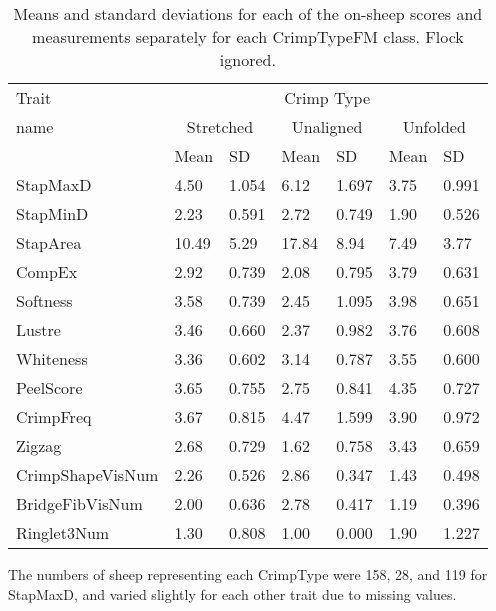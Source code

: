 %

\begin{table}[htp]
\centering
\caption{Means and standard deviations for each of the on-sheep scores and measurements separately for each CrimpTypeFM class. Flock ignored.}
\label{tab:means}
\vspace{0.1in}
\begin{tabular}{|p{1.2in}|p{0.5in}|p{0.5in}|p{0.5in}|p{0.5in}|p{0.5in}|p{0.5in}|}  \hline
  Trait  & \multicolumn{6}{c|}{Crimp Type}     \\ \cline{2-7}  
  name   & \multicolumn{2}{c|}{Stretched}   & \multicolumn{2}{c|}{Unaligned}  & \multicolumn{2}{c|}{Unfolded}  \\ \cline{2-7}
         & Mean & SD & Mean & SD & Mean & SD \\ \hline
 StapMaxD &  4.50  & 1.054 & 6.12  & 1.697 & 3.75 & 0.991 \\
 StapMinD &  2.23  & 0.591 & 2.72  & 0.749 & 1.90 & 0.526 \\
 StapArea &  10.49 & 5.29 & 17.84  & 8.94  & 7.49 & 3.77 \\
 CompEx   &  2.92  & 0.739 & 2.08  & 0.795 & 3.79 & 0.631 \\
 Softness &  3.58  & 0.739 & 2.45  & 1.095 & 3.98 & 0.651 \\
 Lustre   &  3.46  & 0.660 & 2.37  & 0.982 & 3.76 & 0.608 \\
 Whiteness & 3.36  & 0.602 & 3.14  & 0.787 & 3.55 & 0.600 \\
 PeelScore & 3.65  & 0.755 & 2.75  & 0.841 & 4.35 & 0.727 \\
 CrimpFreq & 3.67  & 0.815 & 4.47  & 1.599 & 3.90 & 0.972 \\
 Zigzag   &  2.68  & 0.729 & 1.62  & 0.758 & 3.43 & 0.659 \\ \hline
 CrimpShapeVisNum & 2.26 & 0.526 & 2.86 & 0.347 & 1.43 & 0.498 \\
 BridgeFibVisNum  & 2.00 & 0.636 & 2.78 & 0.417 & 1.19 & 0.396 \\
 Ringlet3Num      & 1.30 & 0.808 & 1.00 & 0.000 & 1.90 & 1.227 \\ \hline
\end{tabular}
\begin{tablenotes}
\small
\item The numbers of sheep representing each CrimpType were 158, 28, and 119 for StapMaxD, and varied slightly for each other trait due to missing values.
\end{tablenotes}
\end{table}


%
